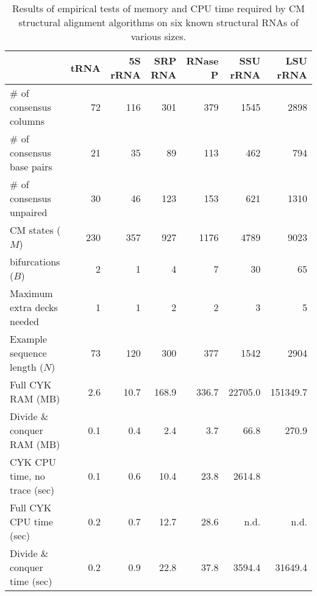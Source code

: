 \documentclass[11pt]{article}
\begin{document}
\begin{table}[ht]
\begin{tabular}{lrrrrrr}
                             & tRNA&5S rRNA&SRP RNA&RNase P&SSU rRNA& LSU rRNA \\\hline 
\# of consensus columns      &  72 &  116 &   301 &   379 &   1545 &    2898\\ 
\# of consensus base pairs   &  21 &   35 &    89 &   113 &    462 &     794\\ 
\# of consensus unpaired     &  30 &   46 &   123 &   153 &    621 &    1310\\ 
CM states ($M$)              & 230 &  357 &   927 &  1176 &   4789 &    9023\\ 
bifurcations ($B$)           &   2 &    1 &     4 &     7 &     30 &      65\\ 
Maximum extra decks needed   &   1 &    1 &     2 &     2 &      3 &       5\\ 
Example sequence length ($N$)&  73 &  120 &   300 &   377 &   1542 &    2904\\
Full CYK RAM (MB)            & 2.6 & 10.7 & 168.9 & 336.7 &22705.0 &151349.7\\
Divide \& conquer RAM (MB)   & 0.1 &  0.4 &   2.4 &   3.7 &   66.8 &   270.9\\ 
CYK CPU time, no trace (sec) & 0.1 &  0.6 &  10.4 &  23.8 & 2614.8 &        \\
Full CYK CPU time (sec)      & 0.2 &  0.7 &  12.7 &  28.6 &   n.d. &    n.d.\\ 
Divide \& conquer time (sec) & 0.2 &  0.9 &  22.8 &  37.8 & 3594.4 & 31649.4\\\hline
\end{tabular}
\caption{Results of empirical tests of memory and CPU time required by
CM structural alignment algorithms on six known structural RNAs of
various sizes.}
\label{tbl:results}
\end{table}






\end{document}
